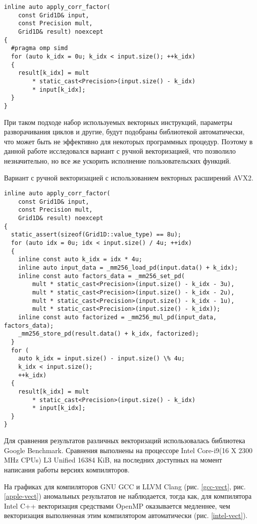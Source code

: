 \begin{lstlisting}[style={CppCodeStyle}]
inline auto apply_corr_factor(
	const Grid1D& input,
	const Precision mult,
	Grid1D& result) noexcept
{
  #pragma omp simd
  for (auto k_idx = 0u; k_idx < input.size(); ++k_idx)
  {
    result[k_idx] = mult 
    	* static_cast<Precision>(input.size() - k_idx)
    	* input[k_idx];
  }
}
\end{lstlisting}

При таком подходе набор используемых векторных инструкций, параметры разворачивания циклов и другие, будут подобраны библиотекой автоматически,
что может быть не эффективно для некоторых программных процедур. Поэтому в данной работе исследовался вариант с ручной векторизацией,
что позволило незначительно, но все же ускорить исполнение пользовательских функций.

Вариант с ручной векторизацией с использованием векторных расширений AVX2.

\begin{lstlisting}[style={CppCodeStyle}]
inline auto apply_corr_factor(
	const Grid1D& input,
	const Precision mult,
	Grid1D& result) noexcept
{
  static_assert(sizeof(Grid1D::value_type) == 8u);
  for (auto idx = 0u; idx < input.size() / 4u; ++idx)
  {
    inline const auto k_idx = idx * 4u;
    inline auto input_data = _mm256_load_pd(input.data() + k_idx);
    inline const auto factors_data = _mm256_set_pd(
        mult * static_cast<Precision>(input.size() - k_idx - 3u),
        mult * static_cast<Precision>(input.size() - k_idx - 2u),
        mult * static_cast<Precision>(input.size() - k_idx - 1u),
        mult * static_cast<Precision>(input.size() - k_idx));
    inline const auto factorized = _mm256_mul_pd(input_data, factors_data);
    _mm256_store_pd(result.data() + k_idx, factorized);
  }
  for (
  	auto k_idx = input.size() - input.size() \% 4u;
  	k_idx < input.size();
  	++k_idx) 
  {
    result[k_idx] = mult
    	* static_cast<Precision>(input.size() - k_idx)
    	* input[k_idx];
  }
}
\end{lstlisting}

Для сравнения результатов различных векторизаций использовалась библиотека Google Benchmark.
Сравнения выполнены на процессоре Intel Core-i9(16 X 2300 MHz CPUs) L3 Unified 16384 KiB, на последних доступных
на момент написания работы версиях компиляторов.

На графиках для компиляторов GNU GCC и LLVM Clang (рис. \ref{gcc-vect}, рис. \ref{apple-vect}) аномальных результатов не наблюдается,
тогда как, для компилятора Intel C++ векторизация средствами OpenMP оказывается медленнее, чем векторизация выполненная
этим компилятором автоматически (рис. \ref{intel-vect}).

